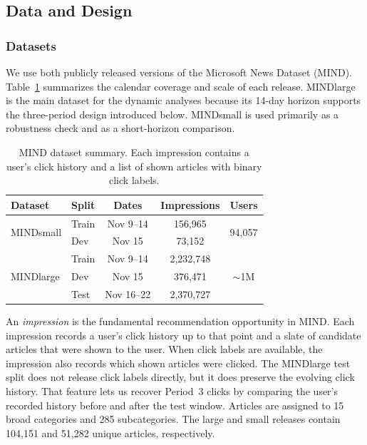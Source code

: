 \documentclass[11pt]{article}
\begin{document}
\subsection{Data and Design}
\label{sec:data}

\subsubsection{Datasets}

We use both publicly released versions of the Microsoft News Dataset (MIND). Table~\ref{tab:datasets} summarizes the calendar coverage and scale of each release. MINDlarge is the main dataset for the dynamic analyses because its 14-day horizon supports the three-period design introduced below. MINDsmall is used primarily as a robustness check and as a short-horizon comparison.

\begin{table}[ht]
\centering
\caption{MIND dataset summary. Each impression contains a user's click history and a list of shown articles with binary click labels.}
\label{tab:datasets}
\begin{tabular}{llccc}
\toprule
Dataset & Split & Dates & Impressions & Users \\
\midrule
\multirow{2}{*}{MINDsmall} & Train & Nov 9--14 & 156,965 & \multirow{2}{*}{94,057} \\
 & Dev & Nov 15 & 73,152 & \\
\midrule
\multirow{3}{*}{MINDlarge} & Train & Nov 9--14 & 2,232,748 & \multirow{3}{*}{${\sim}$1M} \\
 & Dev & Nov 15 & 376,471 & \\
 & Test & Nov 16--22 & 2,370,727 & \\
\bottomrule
\end{tabular}
\end{table}
\FloatBarrier

An \emph{impression} is the fundamental recommendation opportunity in MIND. Each impression records a user's click history up to that point and a slate of candidate articles that were shown to the user. When click labels are available, the impression also records which shown articles were clicked. The MINDlarge test split does not release click labels directly, but it does preserve the evolving click history. That feature lets us recover Period~3 clicks by comparing the user's recorded history before and after the test window. Articles are assigned to 15 broad categories and 285 subcategories. The large and small releases contain 104,151 and 51,282 unique articles, respectively.
\end{document}
